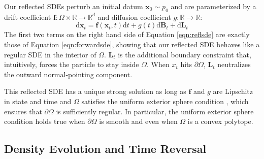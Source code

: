 \documentclass{article}
\theoremstyle{plain}
\theoremstyle{definition}
\theoremstyle{remark}
\newcommand{\R}{\mathbb{R}}
\renewcommand{\vec}{\mathbf}
\newcommand{\dd}{\mathrm{d}}
\begin{document}
Our reflected SDEs perturb an initial datum $\vec{x}_0 \sim p_0$ and are parameterized by a drift coefficient $\vec{f}: \Omega \times \R \to \R^d$ and diffusion coefficient $g: \R \to \R$:
\begin{equation}\label{eqn:reflsde}
    \dd\vec{x}_t = \vec{f}(\vec{x}_t, t)\dd t + g(t) \dd \vec{B}_t + \dd \vec{L}_t
\end{equation}
The first two terms on the right hand side of Equation \ref{eqn:reflsde} are exactly those of Equation \ref{eqn:forwardsde}, showing that our reflected SDE behaves like a regular SDE in the interior of $\Omega$. $\vec{L}_t$ is the additional boundary constraint that, intuitively, forces the particle to stay inside $\Omega$. When $x_t$ hits $\partial \Omega$, $\vec{L}_t$ neutralizes the outward normal-pointing component.

This reflected SDE has a unique strong solution as long as $\vec{f}$ and $g$ are Lipschitz in state and time and $\Omega$ satisfies the uniform exterior sphere condition \citep[Theorem 2.5.4]{Pilipenko2014AnIT}, which ensures that $\partial \Omega$ is sufficiently regular. In particular, the uniform exterior sphere condition holds true when $\partial \Omega$ is smooth and even when $\Omega$ is a convex polytope.

\subsection{Density Evolution and Time Reversal}\label{sec:method:reverse}
\end{document}
